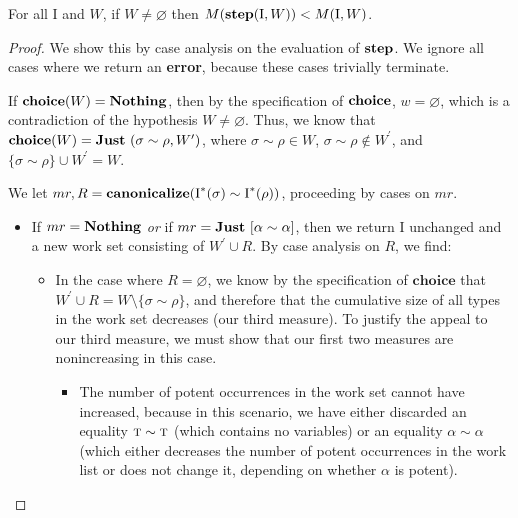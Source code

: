 \documentclass[10pt, letterpaper, oneside]{article}
\newcommand{\inertset}{\text{I}}
\begin{document}
\begin{theorem}
  \label{theorem:decreasing-step}
  For all \(\inertset\) and \(W\!\), if \(W \ne \varnothing\) then \(M(\text{\bf step}(\inertset, W)) < M(\inertset, W)\).
\end{theorem}

\begin{proof}
  We show this by case analysis on the evaluation of \(\text{\bf step}\). We ignore all cases where we return an \textbf{error}, because these cases trivially terminate.

  If \(\text{\bf choice}(W) = \text{\bf Nothing}\), then by the specification of \(\text{\bf choice}\), \(w = \varnothing\), which is a contradiction of the hypothesis \(W \ne \varnothing\). Thus, we know that \(\text{\bf choice}(W) = \text{\bf Just}~(\sigma \sim \rho, W^\prime)\), where \(\sigma \sim \rho \in W\), \(\sigma \sim \rho \notin W^\prime\), and \(\{\sigma \sim \rho\} \cup W^\prime = W\).

  We let \(mr, R = \text{\bf canonicalize}(\inertset^\ast(\sigma) \sim \inertset^\ast(\rho))\), proceeding by cases on \(mr\).

  \begin{itemize}

  \item If \(mr = \text{\bf Nothing}\) \emph{or} if  \(mr = \text{\bf Just}~[\alpha \sim \alpha]\), then we return \(\inertset\) unchanged and a new work set consisting of \(W^\prime \cup R\). By case analysis on \(R\), we find:

    \begin{itemize}

      \item In the case where \(R = \varnothing\), we know by the specification of \(\textbf{choice}\) that \(W^\prime \cup R = W \setminus \{\sigma \sim \rho\}\), and therefore that the cumulative size of all types in the work set decreases (our third measure). To justify the appeal to our third measure, we must show that our first two measures are nonincreasing in this case.

      \begin{itemize}

        \item The number of potent occurrences in the work set cannot have increased, because in this scenario, we have either discarded an equality \(\text{\sc t} \sim \text{\sc t}\) (which contains no variables) or an equality \(\alpha \sim \alpha\) (which either decreases the number of potent occurrences in the work list or does not change it, depending on whether \(\alpha\) is potent).


\end{itemize}
\end{itemize}
\end{itemize}
\end{proof}
\end{document}
